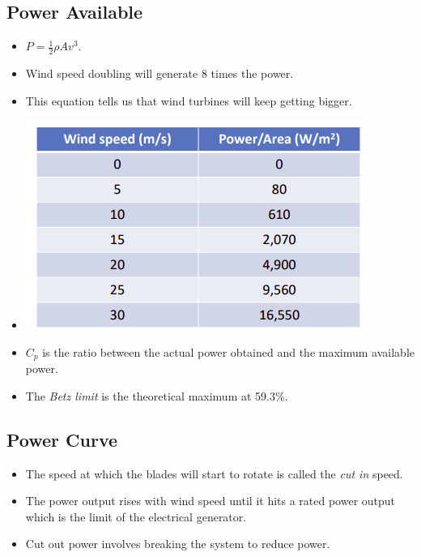 \documentclass[11pt]{article}
\begin{document}
\hypertarget{power-available}{%
\subsection{Power Available}\label{power-available}}

\begin{itemize}
\tightlist
\item
  \(P = \frac{1}{2} \rho A v^3\).
\item
  Wind speed doubling will generate 8 times the power.
\item
  This equation tells us that wind turbines will keep getting bigger.
\item
  \includegraphics{img/windspeedvpowerinair.png}
\item
  \(C_p\) is the ratio between the actual power obtained and the maximum
  available power.
\item
  The \emph{Betz limit} is the theoretical maximum at 59.3\%.
\end{itemize}

\hypertarget{power-curve}{%
\subsection{Power Curve}\label{power-curve}}

\begin{itemize}
\tightlist
\item
  The speed at which the blades will start to rotate is called the
  \emph{cut in} speed.
\item
  The power output rises with wind speed until it hits a rated power
  output which is the limit of the electrical generator.
\item
  Cut out power involves breaking the system to reduce power.
\end{itemize}
\end{document}
